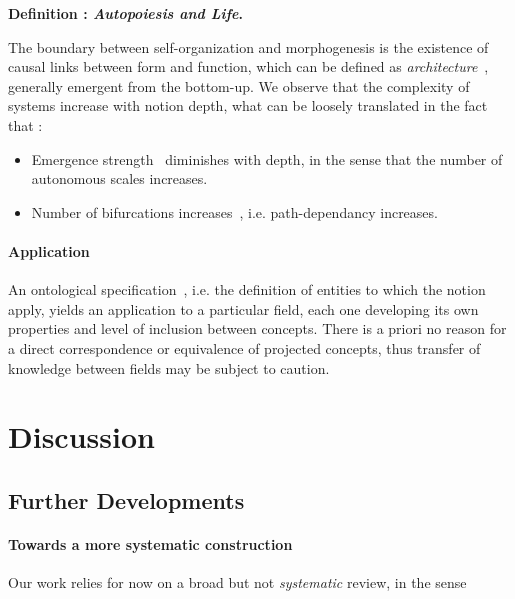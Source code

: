 \documentclass[fleqn,10pt]{wlscirep}
\begin{document}
\medskip

\textbf{Definition : \textit{Autopoiesis and Life}.} 


\medskip

The boundary between self-organization and morphogenesis is the existence of causal links between form and function, which can be defined as \emph{architecture}~\cite{doursat2013review}, generally emergent from the bottom-up. We observe that the complexity of systems increase with notion depth, what can be loosely translated in the fact that :
\begin{itemize}
\item Emergence strength~\cite{bedau2002downward} diminishes with depth, in the sense that the number of autonomous scales increases.
\item Number of bifurcations increases~\cite{thom1974stabilite}, i.e. path-dependancy increases.
\end{itemize}


\paragraph{Application}

An ontological specification~\cite{livet2010ontology}, i.e. the definition of entities to which the notion apply, yields an application to a particular field, each one developing its own properties and level of inclusion between concepts. There is a priori no reason for a direct correspondence or equivalence of projected concepts, thus transfer of knowledge between fields may be subject to caution.


\section*{Discussion}

\subsection*{Further Developments}

\paragraph{Towards a more systematic construction}


Our work relies for now on a broad but not \emph{systematic} review, in the sense
\end{document}
